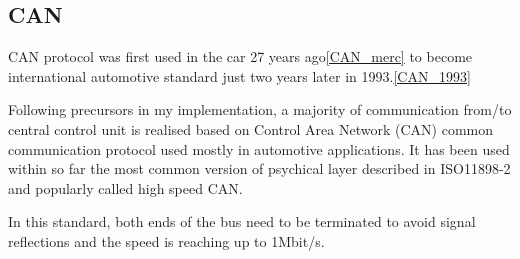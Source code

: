 \subsection{CAN}
CAN protocol was first used in the car 27 years ago\ref{CAN_merc} to become international automotive standard just two years later in 1993.\ref{CAN_1993}

Following precursors in my implementation, a majority of communication from/to central control unit is realised based on Control Area Network (CAN) common communication protocol used mostly in automotive applications. It has been used within so far the most common version of psychical layer described in ISO11898-2 and popularly called high speed CAN.

In this standard, both ends of the bus need to be terminated to avoid signal reflections and the speed is reaching up to 1Mbit/s.

